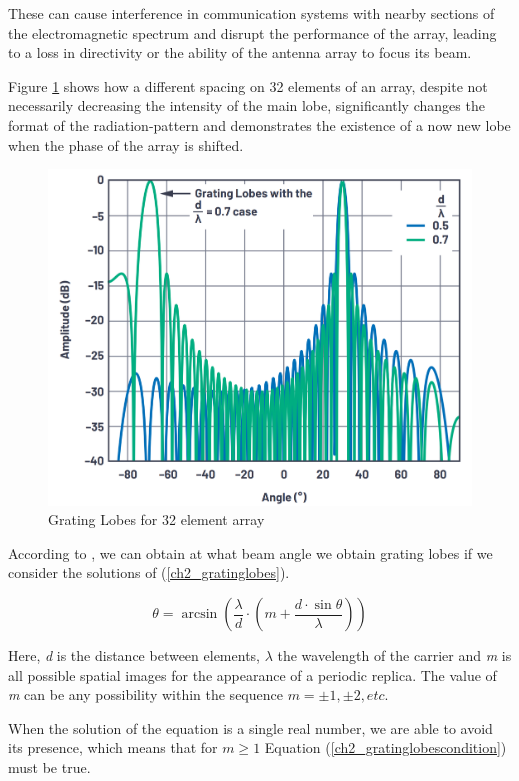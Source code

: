 \par These can cause interference in communication systems with nearby sections of the electromagnetic spectrum and disrupt the performance of the array, leading to a loss in directivity or the ability of the antenna array to focus its beam.

\par Figure \ref{fig:ch2_secArray_GratingLobes.png} shows how a different spacing on 32 elements of an array, despite not necessarily decreasing the intensity of the main lobe, significantly changes the format of the radiation-pattern and demonstrates the existence of a now new lobe when the phase of the array is shifted.

\begin{figure}[H]
    \vspace*{0cm}
    \centering
    \includegraphics[width=0.5\linewidth]{figs/ch2_secArray_GratingLobes.png}
    \caption{Grating Lobes for 32 element array \cite{Delos2020PhasedTapering}}
    \label{fig:ch2_secArray_GratingLobes.png}
\end{figure}


\par According to \citeauthor{Delos2020PhasedTapering}, we can obtain at what beam angle we obtain grating lobes if we consider the solutions of (\ref{ch2_gratinglobes}).

\begin{equation}
    \label{ch2_gratinglobes}
    \theta = \arcsin{\left(\frac{\lambda}{d}\cdot \left( m + \frac{d\cdot\sin{\theta}}{\lambda} \right)\right)}
\end{equation}

\par Here, \textit{d} is the distance between elements, $\lambda$ the wavelength of the carrier and \textit{m} is all possible spatial images for the appearance of a periodic replica. The value of \textit{m} can be any possibility within the sequence $m = \pm1, \pm2, etc$.

\par When the solution of the equation is a single real number, we are able to avoid its presence, which means that for $m\geq1$ Equation (\ref{ch2_gratinglobescondition}) must be true.


